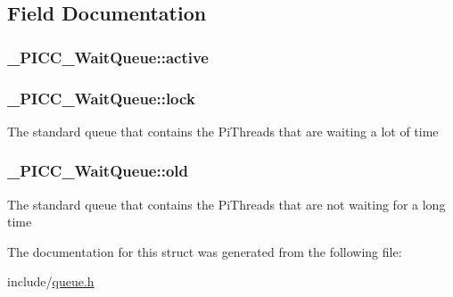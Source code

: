 \subsection{Field Documentation}
\hypertarget{struct__PICC__WaitQueue_a8bc57db481c3efd09e121edd43914dfc}{
\subsubsection[{active}]{ \-\_\-\-P\-I\-C\-C\-\_\-\-Wait\-Queue\-::active}}\label{struct__PICC__WaitQueue_a8bc57db481c3efd09e121edd43914dfc}
\hypertarget{struct__PICC__WaitQueue_a7cb57783c5f64a4f7fa03ce08cd6440c}{
\subsubsection[{lock}]{ \-\_\-\-P\-I\-C\-C\-\_\-\-Wait\-Queue\-::lock}}\label{struct__PICC__WaitQueue_a7cb57783c5f64a4f7fa03ce08cd6440c}
The standard queue that contains the Pi\-Threads that are waiting a lot of time \hypertarget{struct__PICC__WaitQueue_a06098ffdc6ff1893efc3c1017b4d9c5c}{
\subsubsection[{old}]{ \-\_\-\-P\-I\-C\-C\-\_\-\-Wait\-Queue\-::old}}\label{struct__PICC__WaitQueue_a06098ffdc6ff1893efc3c1017b4d9c5c}
The standard queue that contains the Pi\-Threads that are not waiting for a long time 

The documentation for this struct was generated from the following file\-:\begin{DoxyCompactItemize}
\item 
include/\hyperlink{queue_8h}{queue.\-h}\end{DoxyCompactItemize}
